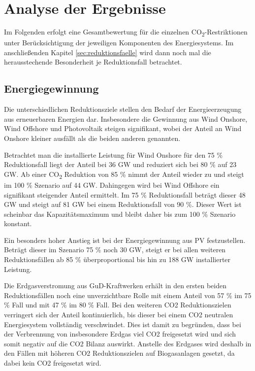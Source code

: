 \section{Analyse der Ergebnisse}
\label{sec:gesamtanalyse}
Im Folgenden erfolgt eine Gesamtbewertung für die einzelnen CO\textsubscript{2}-Restriktionen unter Berücksichtigung der jeweiligen Komponenten des Energiesystems. Im anschließenden Kapitel \ref{sec:reduktionsfaelle} wird dann noch mal die herausstechende Besonderheit je Reduktionsfall betrachtet. 

\subsection{Energiegewinnung}
Die unterschiedlichen Reduktionsziele stellen den Bedarf der Energieerzeugung aus erneuerbaren Energien dar. Insbesondere die Gewinnung aus Wind Onshore, Wind Offshore und Photovoltaik steigen signifikant, wobei der Anteil an Wind Onshore kleiner ausfällt als die beiden anderen genannten. 

Betrachtet man die installierte Leistung für Wind Onshore für den 75 \% Reduktionsfall liegt der Anteil bei 36 GW und reduziert sich bei 80 \% auf 23 GW. Ab einer CO\textsubscript{2} Reduktion von 85 \% nimmt der Anteil wieder zu und steigt im 100 \% Szenario auf 44 GW. 
Dahingegen wird bei Wind Offshore ein signifikant steigender Anteil ermittelt. Im 75 \% Reduktionsfall beträgt dieser 48 GW und steigt auf 81 GW bei einem Reduktionsfall von 90 \%. Dieser Wert ist scheinbar das Kapazitätsmaximum und bleibt daher bis zum 100 \% Szenario konstant.

Ein besonders hoher Anstieg ist bei der Energiegewinnung aus PV festzustellen. Beträgt dieser im Szenario 75 \% noch 30 GW, steigt er bei allen weiteren Reduktionsfällen ab 85 \% überproportional bis hin zu 188 GW installierter Leistung.


Die Erdgasverstromung aus GuD-Kraftwerken erhält in den ersten beiden Reduktionsfällen noch eine unverzichtbare Rolle mit einem Anteil von 57 \% im 75 \% Fall und mit 47 \% im 80 \% Fall. Bei den weiteren CO2 Reduktionszielen verringert sich der Anteil kontinuierlich, bis dieser bei einem CO2 neutralen Energiesystem vollständig verschwindet. Dies ist damit zu begründen, dass bei der Verbrennung von insbesondere Erdgas viel CO2 freigesetzt wird und sich somit negativ auf die CO2 Bilanz auswirkt. Anstelle des Erdgases wird deshalb in den Fällen mit höheren CO2 Reduktionszielen auf Biogasanlagen gesetzt, da dabei kein CO2 freigesetzt wird. 


